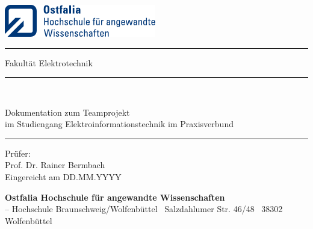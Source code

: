 

    
\begin{titlepage}
    \setlength{\parskip}{0cm}
    \setlength{\parindent}{0cm}
    \sffamily
    \begin{minipage}[t]{66mm}
        \includegraphics[height=14mm]{figs/ostfalia_logo}\par
        \hfill%
        \begin{minipage}[t]{49mm}
            \color{ostfalia-wf-blue}\hrule height 1pt
            \vspace{0.5\baselineskip}
            Fakultät Elektrotechnik
        \end{minipage}
    \end{minipage}
        
    \vfill
    
    {\color[gray]{0.66}\hrule height 1pt}\vspace{0.5\baselineskip}
    
    {\large
        \myAuthorA \\
        \myAuthorB
    \par}\vspace{2\baselineskip}
    
    {\Huge
        \myTitle
    \par}\vspace{2\baselineskip}
    
    {\large
        Dokumentation zum Teamprojekt\\
        im Studiengang Elektroinformationstechnik im Praxisverbund\\
    \par}
    {\color[gray]{0.66}\hrule height 1pt}\vspace{4\baselineskip}

    {\large
        Prüfer:\\
        Prof. Dr. Rainer Bermbach\\[1\baselineskip]
        Eingereicht am DD.MM.YYYY
    \par}

    \vfill
    
    \begin{tcolorbox}[size=tight,
        oversize,
        sharp corners,
        colback=ostfalia-blue,
        colframe=ostfalia-blue,
        boxsep=2ex]
        \color{white}
        \textbf{Ostfalia Hochschule für angewandte Wissenschaften}\\
        -- Hochschule Braunschweig/Wolfenbüttel \textbullet~Salzdahlumer Str. 46/48 \textbullet~38302 Wolfenbüttel
    \end{tcolorbox}
    
\end{titlepage}

\restoregeometry